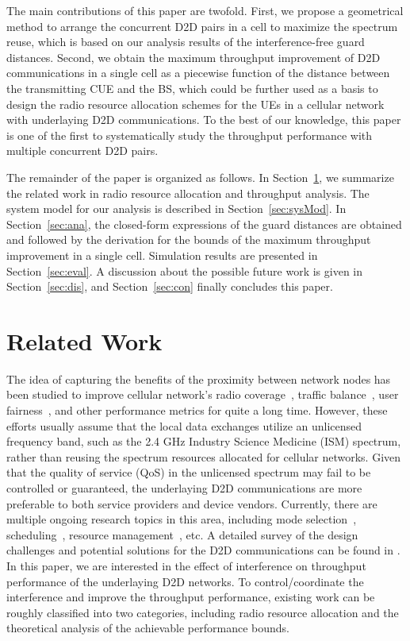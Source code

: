 \documentclass[journal, 10pt]{IEEEtran}
\begin{document}
The main contributions of this paper are twofold. First, we propose a
geometrical method to arrange the concurrent D2D pairs in a cell to
maximize the spectrum reuse, which is based on our analysis results 
of the interference-free guard distances. Second, we obtain the maximum
throughput improvement of D2D communications in a single cell as a
piecewise function of the distance between the transmitting CUE and
the BS, which could be further used as a basis to design the radio
resource allocation schemes for the UEs in a cellular network with
underlaying D2D communications. To the best of our knowledge, this
paper is one of the first to systematically study the throughput
performance with multiple concurrent D2D pairs.

The remainder of the paper is organized as follows. In
Section~\ref{sec:relwork}, we summarize the related work in radio
resource allocation and throughput analysis. The system model for our
analysis is described in Section~\ref{sec:sysMod}. In
Section~\ref{sec:ana}, the closed-form expressions of the guard
distances are obtained and followed by the derivation for the bounds
of the maximum throughput improvement in a single cell. Simulation
results are presented in Section~\ref{sec:eval}. A discussion about
the possible future work is given in Section~\ref{sec:dis}, and
Section~\ref{sec:con} finally concludes this paper.



\section{Related Work}\label{sec:relwork}

The idea of capturing the benefits of the proximity between network
nodes has been studied to improve cellular network's radio
coverage~\cite{Aggelou:01PC}, traffic balance~\cite{Wu:01JSAC}, user
fairness~\cite{Luo:03Mobicom}, and other performance metrics for quite
a long time. However, these efforts usually assume that the local data
exchanges utilize an unlicensed frequency band, such as the 2.4 GHz
Industry Science Medicine (ISM) spectrum, rather than reusing the
spectrum resources allocated for cellular networks. Given that the
quality of service (QoS) in the unlicensed spectrum may fail to be
controlled or guaranteed, the underlaying D2D communications are more
preferable to both service providers and device vendors. Currently,
there are multiple ongoing research topics in this area, including
mode selection~\cite{Min:11TWC-a}, scheduling~\cite{Han:12VTCf},
resource management~\cite{Lee:13WCNC}, etc. A detailed survey of the
design challenges and potential solutions for the D2D communications
can be found in \cite{Fodor:12MCom}. In this paper, we are interested
in the effect of interference on throughput performance of the
underlaying D2D networks. To control/coordinate the interference and
improve the throughput performance, existing work can be roughly
classified into two categories, including radio resource allocation
and the theoretical analysis of the achievable performance bounds. 
\end{document}
